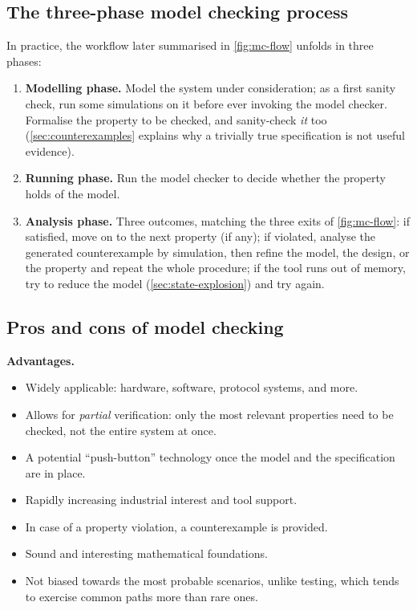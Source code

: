 \subsection{The three-phase model checking process}
\label{sec:mc-process}

In practice, the workflow later summarised in \cref{fig:mc-flow} unfolds in
three phases:
\begin{enumerate}
  \item \textbf{Modelling phase.}  Model the system under consideration; as
        a first sanity check, run some simulations on it before ever
        invoking the model checker.  Formalise the property to be checked,
        and sanity-check \emph{it} too (\cref{sec:counterexamples} explains
        why a trivially true specification is not useful evidence).
  \item \textbf{Running phase.}  Run the model checker to decide whether the
        property holds of the model.
  \item \textbf{Analysis phase.}  Three outcomes, matching the three exits
        of \cref{fig:mc-flow}: if satisfied, move on to the next property
        (if any); if violated, analyse the generated counterexample by
        simulation, then refine the model, the design, or the property and
        repeat the whole procedure; if the tool runs out of memory, try to
        reduce the model (\cref{sec:state-explosion}) and try again.
\end{enumerate}

\subsection{Pros and cons of model checking}

\textbf{Advantages.}
\begin{itemize}[nosep]
  \item Widely applicable: hardware, software, protocol systems, and more.
  \item Allows for \emph{partial} verification: only the most relevant
        properties need to be checked, not the entire system at once.
  \item A potential ``push-button'' technology once the model and the
        specification are in place.
  \item Rapidly increasing industrial interest and tool support.
  \item In case of a property violation, a counterexample is provided.
  \item Sound and interesting mathematical foundations.
  \item Not biased towards the most probable scenarios, unlike testing,
        which tends to exercise common paths more than rare ones.
\end{itemize}

